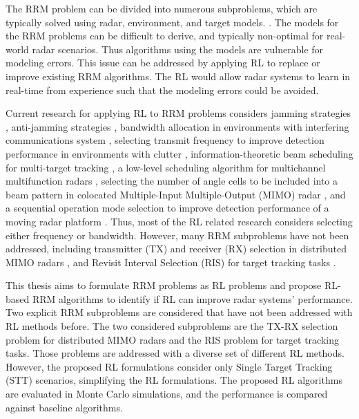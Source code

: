 \documentclass[english, 12pt, a4paper, elec, utf8, a-1b, online]{aaltothesis}
\begin{document}
The RRM problem can be divided into numerous subproblems, which are typically solved using radar, environment, and target models. \cite{Moo2016, Koch1999, Krishnamurthy2001, Wintenby2006, LaScala2006, Rajkumar1997, Rajkumar1998, Kastella1997, Kreucher2004, Kreucher2005, Xu2010}.
The models for the RRM problems can be difficult to derive, and typically non-optimal for real-world radar scenarios. 
Thus algorithms using the models are vulnerable for modeling errors.
This issue can be addressed by applying RL to replace or improve existing RRM algorithms. 
The RL would allow radar systems to learn in real-time from experience such that the modeling errors could be avoided. 

Current research for applying RL to RRM problems considers
jamming strategies \cite{Qiang2017, Wang2019, Wang2019a, Zhang2019},
anti-jamming strategies \cite{Kang2018, Ak2019}, 
bandwidth allocation in environments with interfering communications system \cite{Selvi2018, Kozy2019},
selecting transmit frequency to improve detection performance in environments with clutter \cite{Wabeke2010}, 
information-theoretic beam scheduling for multi-target tracking \cite{Kreucher2005, Xu2010},
a low-level scheduling algorithm for multichannel multifunction radars \cite{Shaghaghi2018},
selecting the number of angle cells to be included into a beam pattern in colocated Multiple-Input Multiple-Output (MIMO) radar \cite{Wang2018}, 
and a sequential operation mode selection to improve detection performance of a moving radar platform \cite{Smits2008}.
Thus, most of the RL related research considers selecting either frequency or bandwidth. 
However, many RRM subproblems have not been addressed, including transmitter (TX) and receiver (RX) selection in distributed MIMO radars \cite{Godrich2011a, Godrich2011, Sun2014}, and Revisit Interval Selection (RIS) for target tracking tasks \cite{Cohen1986, Gardner1988, Munu1992, ChengTing2007, Baek2010, Watson1993, Charlish2015, Keuk1975, Shin1995, Benoudnine2006, Esfahani2012}.

This thesis aims to formulate RRM problems as RL problems and propose RL-based RRM algorithms to identify if RL can improve radar systems' performance.
Two explicit RRM subproblems are considered that have not been addressed with RL methods before.
The two considered subproblems are the TX-RX selection problem for distributed MIMO radars and the RIS problem for target tracking tasks.
Those problems are addressed with a diverse set of different RL methods.
However, the proposed RL formulations consider only Single Target Tracking (STT) scenarios, simplifying the RL formulations. 
The proposed RL algorithms are evaluated in Monte Carlo simulations, and the performance is compared against baseline algorithms.
\end{document}
